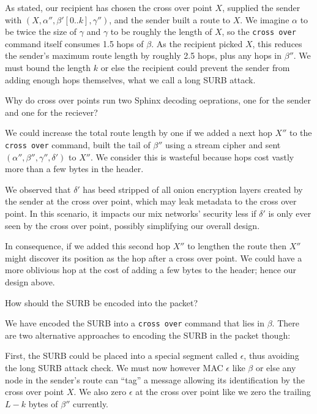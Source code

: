 As stated, our recipient has chosen the cross over point $X$,
supplied the sender with $(X,\alpha'',\beta'[0..k],\gamma'')$,
and the sender built a route to $X$.  We imagine $\alpha$ to be
twice the size of $\gamma$ and $\gamma$ to be roughly the length of
$X$, so the {\tt cross over} command itself consumes 1.5 hops of $\beta$.
As the recipient picked $X$, this reduces the sender's maximum route
length by roughly 2.5 hops, plus any hops in $\beta''$.
We must bound the length $k$ or else the recipient could prevent
the sender from adding enough hops themselves, what we call a
long SURB attack.

\begin{issue}
Why do cross over points run two Sphinx decoding oeprations,
one for the sender and one for the reciever?
\end{issue}

We could increase the total route length by one if we added a next
hop $X''$ to the {\tt cross over} command, built the tail of $\beta''$
using a stream cipher and sent $(\alpha'',\beta'',\gamma'',\delta')$
to $X''$. We consider this is wasteful because hops cost vastly more
than a few bytes in the header.

We observed that $\delta'$ has beed stripped of all onion encryption
layers created by the sender at the cross over point, which may
leak metadata to the cross over point.
In this scenario, it impacts our mix networks' security less if
$\delta'$ is only ever seen by the cross over point, possibly
simplifying our overall design.

In consequence, if we added this second hop $X''$ to lengthen the
route then $X''$ might discover its position as the hop after a
cross over point.  We could have a more oblivious hop at the cost
of adding a few bytes to the header; hence our design above.

\begin{issue}
How should the SURB be encoded into the packet?
\end{issue}

We have encoded the SURB into a {\tt cross over} command that lies
in $\beta$.  There are two alternative approaches to encoding the
SURB in the packet though: 

First, the SURB could be placed into a special segment called
$\epsilon$, thus avoiding the long SURB attack check.
We must now however MAC $\epsilon$ like $\beta$ or else any
node in the sender's route can ``tag'' a message allowing its
identification by the cross over point $X$.  We also zero
$\epsilon$ at the cross over point like we zero the trailing
$L-k$ bytes of $\beta''$ currently.  

